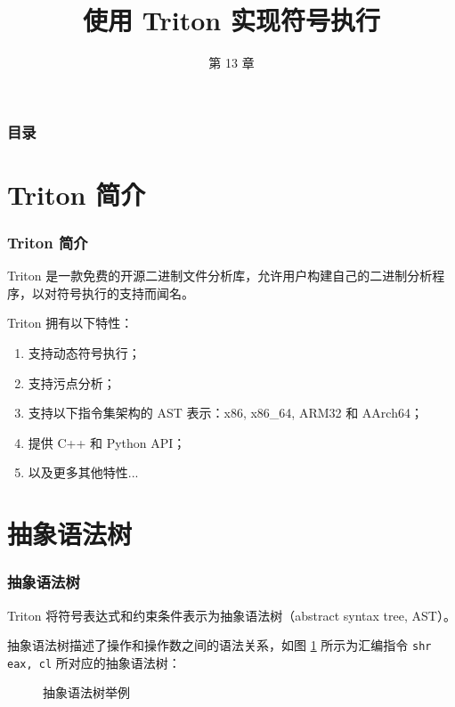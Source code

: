 \documentclass{ctexbeamer}
\author{\theauthor}
\institute[\theshortinst]{\theinst}
\title{使用 Triton 实现符号执行}
\subtitle{第 13 章}
\begin{document}
    \begin{frame}
        \titlepage
    \end{frame}

    \begin{frame}
        \frametitle{目录}
        \tableofcontents
    \end{frame}

    \section{Triton 简介}
    \begin{frame}
        \frametitle{Triton 简介}
    
        Triton 是一款免费的开源二进制文件分析库，允许用户构建自己的二进制分析程序，以对符号执行的支持而闻名。

        Triton 拥有以下特性：

        \begin{enumerate}
            \item 支持动态符号执行；\pause
            \item 支持污点分析；\pause
            \item 支持以下指令集架构的 AST 表示：x86, x86\_64, ARM32 和 AArch64；\pause
            \item 提供 C++ 和 Python API；\pause
            \item 以及更多其他特性...
        \end{enumerate}
    
    \end{frame}

    \section{抽象语法树}
    \begin{frame}[fragile]
        \frametitle{抽象语法树}
    
        Triton 将符号表达式和约束条件表示为抽象语法树（abstract syntax tree, AST）。

        抽象语法树描述了操作和操作数之间的语法关系，如图 \ref{fig:ast-example} 所示为汇编指令 \texttt{shr eax, cl} 所对应的抽象语法树：

        \begin{figure}
            \centering
            \caption{抽象语法树举例}
            \label{fig:ast-example}
        \end{figure}

    
    \end{frame}
\end{document}
